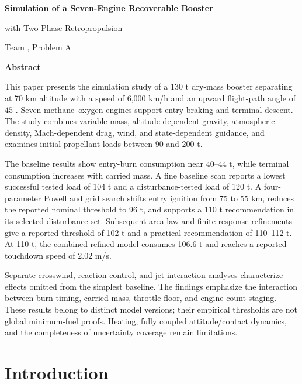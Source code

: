 \documentclass[11pt,a4paper]{article}
\begin{document}
\hypersetup{pageanchor=false}
\thispagestyle{fancy}
\begin{center}
\vspace*{6mm}
{\LARGE\bfseries Simulation of a Seven-Engine Recoverable Booster\par with Two-Phase Retropropulsion\par}
\vspace{5mm}
{\large Team \TeamNumber, Problem A\par}
\vspace{6mm}
{\large\bfseries Abstract\par}
\end{center}
\noindent
This paper presents the simulation study of a 130 t dry-mass booster separating at 70 km altitude with a speed of 6,000 km/h and an upward flight-path angle of $45^\circ$. Seven methane--oxygen engines support entry braking and terminal descent. The study combines variable mass, altitude-dependent gravity, atmospheric density, Mach-dependent drag, wind, and state-dependent guidance, and examines initial propellant loads between 90 and 200 t.

The baseline results show entry-burn consumption near 40--44 t, while terminal consumption increases with carried mass. A fine baseline scan reports a lowest successful tested load of 104 t and a disturbance-tested load of 120 t. A four-parameter Powell and grid search shifts entry ignition from 75 to 55 km, reduces the reported nominal threshold to 96 t, and supports a 110 t recommendation in its selected disturbance set. Subsequent area-law and finite-response refinements give a reported threshold of 102 t and a practical recommendation of 110--112 t. At 110 t, the combined refined model consumes 106.6 t and reaches a reported touchdown speed of 2.02 m/s.

Separate crosswind, reaction-control, and jet-interaction analyses characterize effects omitted from the simplest baseline. The findings emphasize the interaction between burn timing, carried mass, throttle floor, and engine-count staging. These results belong to distinct model versions; their empirical thresholds are not global minimum-fuel proofs. Heating, fully coupled attitude/contact dynamics, and the completeness of uncertainty coverage remain limitations.
\clearpage
\hypersetup{pageanchor=true}
{\small\tableofcontents}
\clearpage
{}

\section{Introduction}
\end{document}
